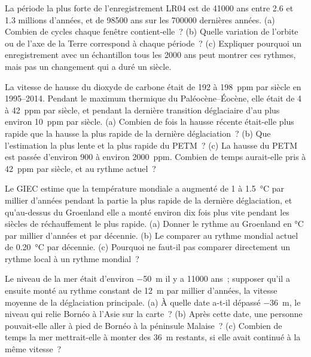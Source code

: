 \begin{exercise}[$\star\star\star$]\label{exo:g12:past-climates:12}
La période la plus forte de l'enregistrement LR04 est de \num{41000} ans
entre 2.6 et 1.3 millions d'années, et de \num{98500} ans sur les
\num{700000} dernières années. (a) Combien de cycles chaque fenêtre
contient-elle~? (b) Quelle variation de l'orbite ou de l'axe de la Terre
correspond à chaque période~? (c) Expliquer pourquoi un enregistrement
avec un échantillon tous les \num{2000} ans peut montrer ces rythmes, mais
pas un changement qui a duré un siècle.
\end{exercise}

\begin{exercise}[$\star\star\star$]\label{exo:g12:past-climates:13}
La vitesse de hausse du dioxyde de carbone était de 192 à \qty{198}{ppm}
par siècle en 1995--2014. Pendant le maximum thermique du
Paléocène--Éocène, elle était de 4 à \qty{42}{ppm} par siècle, et pendant
la dernière transition déglaciaire d'au plus environ \qty{10}{ppm} par
siècle. (a) Combien de fois la hausse récente était-elle plus rapide que
la hausse la plus rapide de la dernière déglaciation~? (b) Que l'estimation
la plus lente et la plus rapide du PETM~? (c) La hausse du PETM est passée
d'environ 900 à environ \qty{2000}{ppm}. Combien de temps aurait-elle pris
à \qty{42}{ppm} par siècle, et au rythme actuel~?
\end{exercise}

\begin{exercise}[$\star\star\star$]\label{exo:g12:past-climates:14}
Le GIEC estime que la température mondiale a augmenté de 1 à
\qty{1.5}{\degreeCelsius} par millier d'années pendant la partie la plus
rapide de la dernière déglaciation, et qu'au-dessus du Groenland elle a
monté environ dix fois plus vite pendant les siècles de réchauffement le
plus rapide. (a) Donner le rythme au Groenland en \unit{\degreeCelsius}
par millier d'années et par décennie. (b) Le comparer au rythme mondial
actuel de \qty{0.20}{\degreeCelsius} par décennie. (c) Pourquoi ne faut-il
pas comparer directement un rythme local à un rythme mondial~?
\end{exercise}

\begin{exercise}[$\star\star\star$]\label{exo:g12:past-climates:15}
Le niveau de la mer était d'environ \qty{-50}{m} il y a \num{11000} ans~;
supposer qu'il a ensuite monté au rythme constant de \qty{12}{m} par
millier d'années, la vitesse moyenne de la déglaciation principale. (a) À
quelle date a-t-il dépassé \qty{-36}{m}, le niveau qui relie Bornéo à
l'Asie sur la carte~? (b) Après cette date, une personne pouvait-elle aller
à pied de Bornéo à la péninsule Malaise~? (c) Combien de temps la mer
mettrait-elle à monter des \qty{36}{m} restants, si elle avait continué à
la même vitesse~?
\end{exercise}

